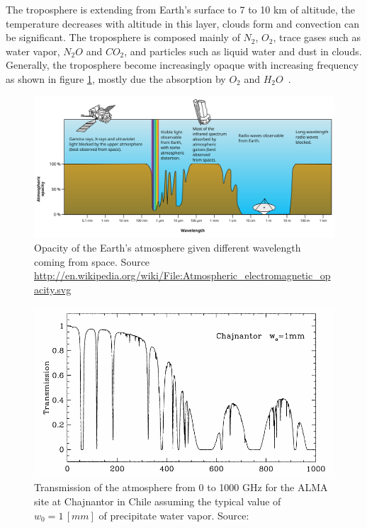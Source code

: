 The troposphere is extending from Earth's surface to 7 to 10 km of altitude, the temperature decreases with altitude in this layer, clouds form and convection can be significant. The troposphere is composed mainly of $N_2$, $O_2$, trace gases such as water vapor, $N_2O$ and $CO_2$, and particles such as liquid water and dust in clouds. Generally, the troposphere become increasingly opaque with increasing frequency as shown in figure \ref{fig:atmospheric-opacity}, mostly due the absorption by $O_2$ and $H_2O$~\cite{taylor99}.

\begin{figure}[htbp]
\includegraphics[width=\textwidth]{images/Atmospheric_electromagnetic_opacity}
\caption[Opacity of the Earth's atmosphere given different wavelength coming from space]{Opacity of the Earth's atmosphere given different wavelength coming from space. Source \url{http://en.wikipedia.org/wiki/File:Atmospheric_electromagnetic_opacity.svg}}
\label{fig:atmospheric-opacity}
\end{figure}

\begin{figure}[]
\includegraphics[width=\textwidth]{images/chajnantor-atm-transmission}
\caption[Transmission of the atmosphere from 0 to 1000 GHz for the ALMA site at Chajnantor in Chile]{Transmission of the atmosphere from 0 to 1000 GHz for the ALMA site at Chajnantor in Chile assuming the typical value of $w_0 = 1\,[mm]$ of precipitate water vapor. Source: \cite{taylor99}}
\label{fig:chaj-atm-tx}
\end{figure}

